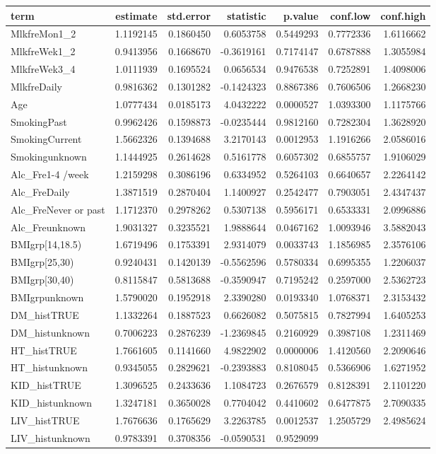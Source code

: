 \documentclass[]{article}
\begin{document}
\begin{longtable}[]{@{}lrrrrrr@{}}
\toprule
term & estimate & std.error & statistic & p.value & conf.low &
conf.high\tabularnewline
\midrule
\endhead
MlkfreMon1\_2 & 1.1192145 & 0.1860450 & 0.6053758 & 0.5449293 &
0.7772336 & 1.6116662\tabularnewline
MlkfreWek1\_2 & 0.9413956 & 0.1668670 & -0.3619161 & 0.7174147 &
0.6787888 & 1.3055984\tabularnewline
MlkfreWek3\_4 & 1.0111939 & 0.1695524 & 0.0656534 & 0.9476538 &
0.7252891 & 1.4098006\tabularnewline
MlkfreDaily & 0.9816362 & 0.1301282 & -0.1424323 & 0.8867386 & 0.7606506
& 1.2668230\tabularnewline
Age & 1.0777434 & 0.0185173 & 4.0432222 & 0.0000527 & 1.0393300 &
1.1175766\tabularnewline
SmokingPast & 0.9962426 & 0.1598873 & -0.0235444 & 0.9812160 & 0.7282304
& 1.3628920\tabularnewline
SmokingCurrent & 1.5662326 & 0.1394688 & 3.2170143 & 0.0012953 &
1.1916266 & 2.0586016\tabularnewline
Smokingunknown & 1.1444925 & 0.2614628 & 0.5161778 & 0.6057302 &
0.6855757 & 1.9106029\tabularnewline
Alc\_Fre1-4 /week & 1.2159298 & 0.3086196 & 0.6334952 & 0.5264103 &
0.6640657 & 2.2264142\tabularnewline
Alc\_FreDaily & 1.3871519 & 0.2870404 & 1.1400927 & 0.2542477 &
0.7903051 & 2.4347437\tabularnewline
Alc\_FreNever or past & 1.1712370 & 0.2978262 & 0.5307138 & 0.5956171 &
0.6533331 & 2.0996886\tabularnewline
Alc\_Freunknown & 1.9031327 & 0.3235521 & 1.9888644 & 0.0467162 &
1.0093946 & 3.5882043\tabularnewline
BMIgrp{[}14,18.5) & 1.6719496 & 0.1753391 & 2.9314079 & 0.0033743 &
1.1856985 & 2.3576106\tabularnewline
BMIgrp{[}25,30) & 0.9240431 & 0.1420139 & -0.5562596 & 0.5780334 &
0.6995355 & 1.2206037\tabularnewline
BMIgrp{[}30,40) & 0.8115847 & 0.5813688 & -0.3590947 & 0.7195242 &
0.2597000 & 2.5362723\tabularnewline
BMIgrpunknown & 1.5790020 & 0.1952918 & 2.3390280 & 0.0193340 &
1.0768371 & 2.3153432\tabularnewline
DM\_histTRUE & 1.1332264 & 0.1887523 & 0.6626082 & 0.5075815 & 0.7827994
& 1.6405253\tabularnewline
DM\_histunknown & 0.7006223 & 0.2876239 & -1.2369845 & 0.2160929 &
0.3987108 & 1.2311469\tabularnewline
HT\_histTRUE & 1.7661605 & 0.1141660 & 4.9822902 & 0.0000006 & 1.4120560
& 2.2090646\tabularnewline
HT\_histunknown & 0.9345055 & 0.2829621 & -0.2393883 & 0.8108045 &
0.5366906 & 1.6271952\tabularnewline
KID\_histTRUE & 1.3096525 & 0.2433636 & 1.1084723 & 0.2676579 &
0.8128391 & 2.1101220\tabularnewline
KID\_histunknown & 1.3247181 & 0.3650028 & 0.7704042 & 0.4410602 &
0.6477875 & 2.7090335\tabularnewline
LIV\_histTRUE & 1.7676636 & 0.1765629 & 3.2263785 & 0.0012537 &
1.2505729 & 2.4985624\tabularnewline
LIV\_histunknown & 0.9783391 & 0.3708356 & -0.0590531 & 0.9529099 &

\end{longtable}
\end{document}

